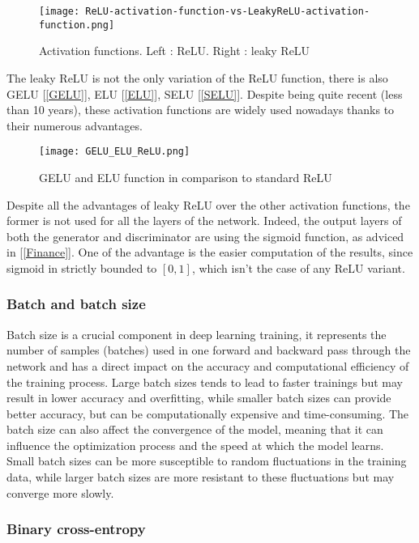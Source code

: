 \documentclass [12pt] {article}
\numberwithin{equation}{section} %
\numberwithin{figure}{section}   %
\begin{document}
\begin{figure}[H]
    \centering
    \texttt{[image: ReLU-activation-function-vs-LeakyReLU-activation-function.png]}
    \caption{Activation functions. Left : ReLU. Right : leaky ReLU}
    \label{relu and leaky relu}
\end{figure}

The leaky ReLU is not the only variation of the ReLU function, there is also GELU [\ref{GELU}], ELU [\ref{ELU}], SELU [\ref{SELU}]. Despite being quite recent (less than 10 years), these activation functions are widely used nowadays thanks to their numerous advantages.

\begin{figure}[H]
    \centering
    \texttt{[image: GELU\_ELU\_ReLU.png]}
    \caption{GELU and ELU function in comparison to standard ReLU}
    \label{gelu elu}
\end{figure}

Despite all the advantages of leaky ReLU over the other activation functions, the former is not used for all the layers of the network. Indeed, the output layers of both the generator and discriminator are using the sigmoid function, as adviced in [\ref{Finance}]. One of the advantage is the easier computation of the results, since sigmoid in strictly bounded to $[0,1]$, which isn't the case of any ReLU variant.

\subsubsection*{Batch and batch size}
Batch size is a crucial component in deep learning training, it represents the number of samples (batches) used in one forward and backward pass through the network and has a direct impact on the accuracy and computational efficiency of the training process. Large batch sizes tends to lead to faster trainings but may result in lower accuracy and overfitting, while smaller batch sizes can provide better accuracy, but can be computationally expensive and time-consuming. The batch size can also affect the convergence of the model, meaning that it can influence the optimization process and the speed at which the model learns. Small batch sizes can be more susceptible to random fluctuations in the training data, while larger batch sizes are more resistant to these fluctuations but may converge more slowly.

\subsubsection*{Binary cross-entropy}
\end{document}
